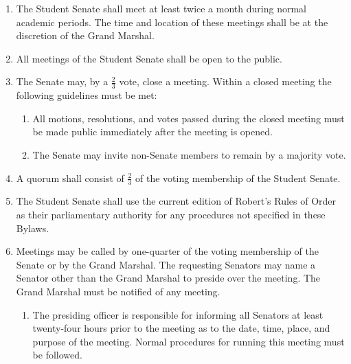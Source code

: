 
\begin{enumerate}

\item The Student Senate shall meet at least twice a month during normal academic periods. The time and location of these meetings
shall be at the discretion of the Grand Marshal.
\item All meetings of the Student Senate shall be open to the public.
\item The Senate may, by a $\frac{2}{3}$ vote, close a meeting. Within a closed meeting the following guidelines must be met:
\begin{enumerate}
\item All motions, resolutions, and votes passed during the closed meeting must be made public immediately after the meeting is
opened.
\item The Senate may invite non-Senate members to remain by a majority vote.
\end{enumerate}
\item A quorum shall consist of $\frac{2}{3}$ of the voting membership of the Student Senate.
\item The Student Senate shall use the current edition of Robert’s Rules of Order as their parliamentary authority for any procedures
not specified in these Bylaws.
\item Meetings may be called by one-quarter of the voting membership of the Senate or by the Grand Marshal. The requesting
Senators may name a Senator other than the Grand Marshal to preside over the meeting. The Grand Marshal must be notified of
any meeting.
\begin{enumerate}
\item The presiding officer is responsible for informing all Senators at least twenty-four hours prior to the meeting as to the date,
time, place, and purpose of the meeting. Normal procedures for running this meeting must be followed.
\end{enumerate}
\end{enumerate}